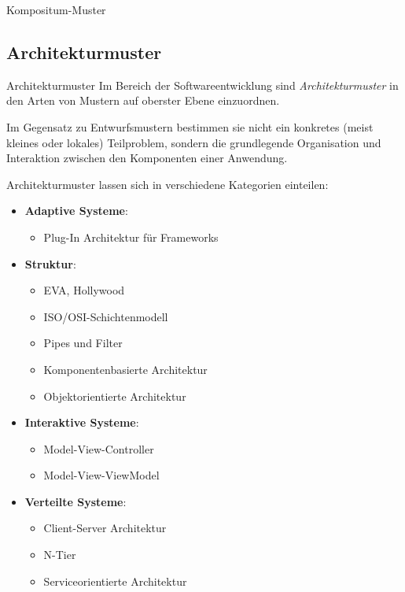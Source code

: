 \begin{example}{Kompositum-Muster}
    

    
\end{example}

\subsection{Architekturmuster}

\begin{defi}{Architekturmuster}
    Im Bereich der Softwareentwicklung sind \emph{Architekturmuster} in den Arten von Mustern auf oberster Ebene einzuordnen.

    Im Gegensatz zu Entwurfsmustern bestimmen sie nicht ein konkretes (meist kleines oder lokales) Teilproblem, sondern die grundlegende Organisation und Interaktion zwischen den Komponenten einer Anwendung.

    Architekturmuster lassen sich in verschiedene Kategorien einteilen:
    \begin{itemize}
        \item \textbf{Adaptive Systeme}:
              \begin{itemize}
                  \item Plug-In Architektur für Frameworks
              \end{itemize}
        \item \textbf{Struktur}:
              \begin{itemize}
                  \item EVA, Hollywood
                  \item ISO/OSI-Schichtenmodell
                  \item Pipes und Filter
                  \item Komponentenbasierte Architektur
                  \item Objektorientierte Architektur
              \end{itemize}
        \item \textbf{Interaktive Systeme}:
              \begin{itemize}
                  \item Model-View-Controller
                  \item Model-View-ViewModel
              \end{itemize}
        \item \textbf{Verteilte Systeme}:
              \begin{itemize}
                  \item Client-Server Architektur
                  \item N-Tier
                  \item Serviceorientierte Architektur
              \end{itemize}
    \end{itemize}
\end{defi}

